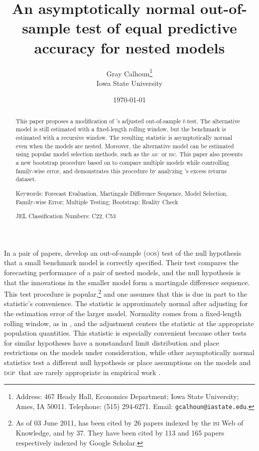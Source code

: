 \documentclass[12pt]{article}
\newcommand\citepos[2][]{\citeauthor{#2}'s \citeyearpar[#1]{#2}}
\theoremstyle{definition}
\newcommand{\aic}{\textsc{aic}}
\newcommand{\bic}{\textsc{bic}}
\newcommand{\dgp}{\textsc{dgp}}
\newcommand{\oos}{\textsc{oos}}
\begin{document}
\author{Gray Calhoun\thanks{Address: 467 Heady Hall, Economics
    Department; Iowa State University; Ames, IA 50011. Telephone:
    (515) 294-6271.  Email: \texttt{gcalhoun@iastate.edu}.} \\ Iowa
  State University}

\title{An asymptotically normal out-of-sample
  test of equal predictive accuracy for nested models} \date{\today}
\maketitle

\begin{abstract} 
  \noindent This paper proposes a modification of \citepos[J.
  Econom.]{ClW:07} adjusted out-of-sample $t$-test.  The
  alternative model is still estimated with a fixed-length rolling
  window, but the benchmark is estimated with a recursive window. The
  resulting statistic is asymptotically normal even when the models
  are nested.  Moreover, the alternative model can be estimated using
  popular model selection methods, such as the \aic\ or \bic.  This
  paper also presents a new bootstrap procedure based on
  \citet[Econometrica]{RoW:05} to compare multiple models while
  controlling family-wise error, and demonstrates this procedure by
  analyzing \citepos[Rev. Finan. Stud.]{GoW:08} excess returns dataset.

\strut

\noindent Keywords: Forecast Evaluation, Martingale Difference
Sequence, Model Selection, Family-wise Error; Multiple Testing;
Bootstrap; Reality Check

\strut

\noindent JEL Classification Numbers: C22, C53

\end{abstract}

\newpage \noindent In a pair of papers, \citet{ClW:06,ClW:07} develop
an out-of-sample (\oos) test of the null hypothesis that a small
benchmark model is correctly specified.  Their test compares the
forecasting performance of a pair of nested models, and the null
hypothesis is that the innovations in the smaller model form a
martingale difference sequence.  This test procedure is
popular,\footnote{As of 03 June 2011, \citet{ClW:06} has been cited by
  26 papers indexed by the \textsc{isi} Web of Knowledge, and
  \citet{ClW:07} by 37. They have been cited by 113 and 165 papers
  respectively indexed by Google Scholar.} and one assumes that this
is due in part to the statistic's convenience.  The statistic is
approximately normal after adjusting for the estimation error of the
larger model.  Normality comes from a fixed-length rolling window, as
in \citet{GiW:06}, and the adjustment centers the statistic at the
appropriate population quantities.  This statistic is especially
convenient because other tests for similar hypotheses \citep[among
others]{Mcc:07,ClM:05,ClM:01,CoS:04,CoS:02,CCS:01} have a nonstandard
limit distribution and place restrictions on the models under
consideration, while other asymptotically normal statistics test a
different null hypothesis \citep{GiW:06} or place assumptions on the
models and \dgp\ that are rarely appropriate in empirical work
\citep{Wes:96,WeM:98,Mcc:00,DiM:95}.
\end{document}
